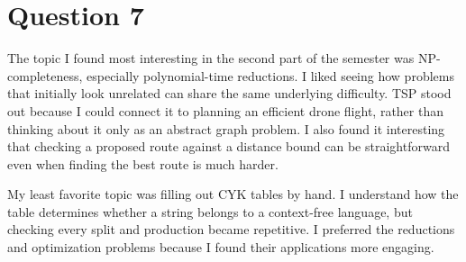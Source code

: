 \documentclass[11pt]{article}
\begin{document}
\section*{Question 7}
The topic I found most interesting in the second part of the semester was NP-completeness, especially polynomial-time reductions. I liked seeing how problems that initially look unrelated can share the same underlying difficulty. TSP stood out because I could connect it to planning an efficient drone flight, rather than thinking about it only as an abstract graph problem. I also found it interesting that checking a proposed route against a distance bound can be straightforward even when finding the best route is much harder.

My least favorite topic was filling out CYK tables by hand. I understand how the table determines whether a string belongs to a context-free language, but checking every split and production became repetitive. I preferred the reductions and optimization problems because I found their applications more engaging.
\end{document}
